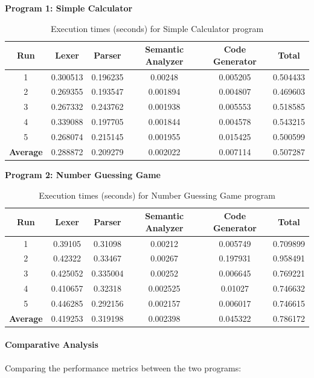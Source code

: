 \documentclass[conference]{IEEEtran}
\begin{document}
\textbf{Program 1: Simple Calculator}
\begin{table}[h]
	\centering
	\begin{tabular}{|c|c|c|c|c|c|}
		\hline
		\textbf{Run} & \textbf{Lexer} & \textbf{Parser} & \textbf{Semantic Analyzer} & \textbf{Code Generator} & \textbf{Total} \\
		\hline
		1 & 0.300513 & 0.196235 & 0.00248 & 0.005205 & 0.504433 \\
		\hline
		2 & 0.269355 & 0.193547 & 0.001894 & 0.004807 & 0.469603 \\
		\hline
		3 & 0.267332 & 0.243762 & 0.001938 & 0.005553 & 0.518585 \\
		\hline
		4 & 0.339088 & 0.197705 & 0.001844 & 0.004578 & 0.543215 \\
		\hline
		5 & 0.268074 & 0.215145 & 0.001955 & 0.015425 & 0.500599 \\
		\hline
		\textbf{Average} & 0.288872 & 0.209279 & 0.002022 & 0.007114 & 0.507287 \\
		\hline
	\end{tabular}
	\caption{Execution times (seconds) for Simple Calculator program}
	\label{tab:performance_results_prog1}
\end{table}

\textbf{Program 2: Number Guessing Game}
\begin{table}[h]
	\centering
	\begin{tabular}{|c|c|c|c|c|c|}
		\hline
		\textbf{Run} & \textbf{Lexer} & \textbf{Parser} & \textbf{Semantic Analyzer} & \textbf{Code Generator} & \textbf{Total} \\
		\hline
		1 & 0.39105 & 0.31098 & 0.00212 & 0.005749 & 0.709899 \\
		\hline
		2 & 0.42322 & 0.33467 & 0.00267 & 0.197931 & 0.958491 \\
		\hline
		3 & 0.425052 & 0.335004 & 0.00252 & 0.006645 & 0.769221 \\
		\hline
		4 & 0.410657 & 0.32318 & 0.002525 & 0.01027 & 0.746632 \\
		\hline
		5 & 0.446285 & 0.292156 & 0.002157 & 0.006017 & 0.746615 \\
		\hline
		\textbf{Average} & 0.419253 & 0.319198 & 0.002398 & 0.045322 & 0.786172 \\
		\hline
	\end{tabular}
	\caption{Execution times (seconds) for Number Guessing Game program}
	\label{tab:performance_results_prog2}
\end{table}

\paragraph{Comparative Analysis}
Comparing the performance metrics between the two programs:
\end{document}
